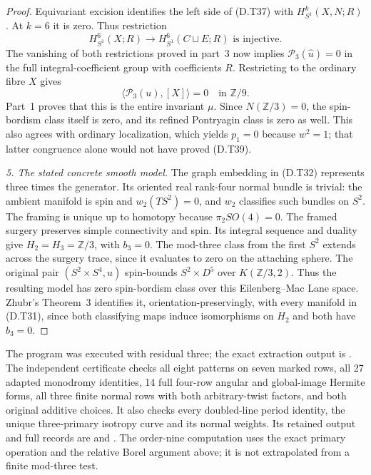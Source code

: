 \begin{proof}
Equivariant excision identifies the left side of (D.T37) with
$H^k_{S^1}(X,N;R)$. At $k=6$ it is zero. Thus restriction
\[
 H^6_{S^1}(X;R)\longrightarrow H^6_{S^1}(C\sqcup E;R)
                         \text{ is injective}.               \tag{D.T38}
\]
The vanishing of both restrictions proved in part~3 now implies
$\mathcal P_3(\widehat u)=0$ in the full integral-coefficient group
with coefficients $R$. Restricting to the ordinary fibre $X$ gives
\[
                        \langle\mathcal P_3(u),[X]\rangle=0
                                     \quad\text{in }\mathbb Z/9.
                                                               \tag{D.T39}
\]
Part~1 proves that this is the entire invariant $\mu$. Since
$N(\mathbb Z/3)=0$, the spin-bordism class itself is zero, and its
refined Pontryagin class is zero as well. This also agrees with
ordinary localization, which yields $p_1=0$ because $w^2=1$;
that latter congruence alone would not have proved (D.T39).

\emph{5. The stated concrete smooth model.}
The graph embedding in (D.T32) represents three times the generator.
Its oriented real rank-four normal bundle is trivial: the ambient
manifold is spin and $w_2(TS^2)=0$, and $w_2$ classifies such bundles
on $S^2$. The framing is unique up to homotopy because
$\pi_2SO(4)=0$. The framed surgery preserves simple connectivity
and spin. Its integral sequence and duality give
$H_2=H_3=\mathbb Z/3$, with $b_3=0$.
The mod-three class from the first $S^2$ extends across the surgery
trace, since it evaluates to zero on the attaching sphere.
The original pair $(S^2\times S^4,u)$ spin-bounds
$S^2\times D^5$ over $K(\mathbb Z/3,2)$.
Thus the resulting model has zero spin-bordism class over this
Eilenberg--Mac Lane space. Zhubr's Theorem~3
\cite[p.795]{manZhubr75} identifies it, orientation-preservingly,
with every manifold in (D.T31), since both classifying maps induce
isomorphisms on $H_2$ and both have $b_3=0$.
\end{proof}

The program  was executed with
residual three; the exact extraction output is
.
The independent certificate 
checks all eight patterns on seven marked rows, all 27 adapted
monodromy identities, 14 full four-row angular and global-image
Hermite forms, all three finite normal rows with both arbitrary-twist
factors, and both original additive choices. It also checks every
doubled-line period identity, the unique three-primary isotropy
curve and its normal weights. Its retained output and full
records are  and
. The order-nine computation
uses the exact primary operation and the relative Borel argument
above; it is not extrapolated from a finite mod-three test.

